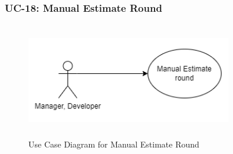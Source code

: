 \subsubsection{UC-18: Manual Estimate Round}
\begin{figure}[H]
    \includegraphics[height=5cm, width=0.8\textwidth]{./diagrams/Use Case/u18.png}
    \centering
    \caption{Use Case Diagram for Manual Estimate Round}
    \label{fig:Usecase1}
\end{figure}

